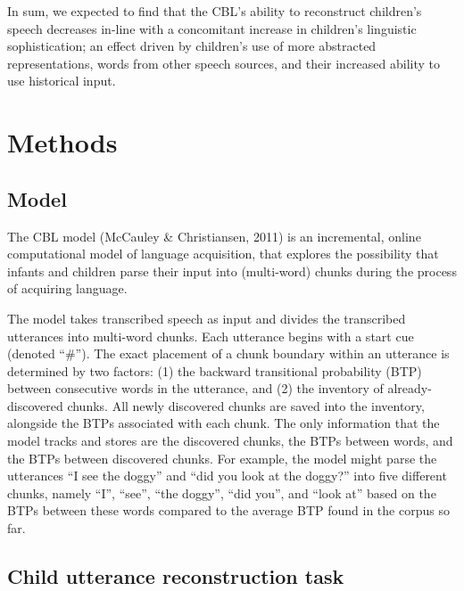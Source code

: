 \documentclass[man,mask,floatsintext]{apa6}
\begin{document}
In sum, we expected to find that the CBL's ability to reconstruct
children's speech decreases in-line with a concomitant increase in
children's linguistic sophistication; an effect driven by children's use
of more abstracted representations, words from other speech sources, and
their increased ability to use historical input.

\section{Methods}\label{methods}

\subsection{Model}\label{model}

The CBL model (McCauley \& Christiansen, 2011) is an incremental, online
computational model of language acquisition, that explores the
possibility that infants and children parse their input into
(multi-word) chunks during the process of acquiring language.

The model takes transcribed speech as input and divides the transcribed
utterances into multi-word chunks. Each utterance begins with a start
cue (denoted \enquote{\#}). The exact placement of a chunk boundary
within an utterance is determined by two factors: (1) the backward
transitional probability (BTP) between consecutive words in the
utterance, and (2) the inventory of already-discovered chunks. All newly
discovered chunks are saved into the inventory, alongside the BTPs
associated with each chunk. The only information that the model tracks
and stores are the discovered chunks, the BTPs between words, and the
BTPs between discovered chunks. For example, the model might parse the
utterances \enquote{I see the doggy} and \enquote{did you look at the
doggy?} into five different chunks, namely \enquote{I}, \enquote{see},
\enquote{the doggy}, \enquote{did you}, and \enquote{look at} based on
the BTPs between these words compared to the average BTP found in the
corpus so far.

\subsection{Child utterance reconstruction
task}\label{child-utterance-reconstruction-task}
\end{document}
